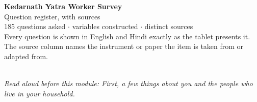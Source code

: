 \documentclass[9pt,a4paper,landscape]{article}
\begin{document}
\begin{center}
{\LARGE\bfseries Kedarnath Yatra Worker Survey}\\[3pt]
{\large Question register, with sources}\\[8pt]
185 questions asked \quad$\cdot$ variables constructed \quad$\cdot$ distinct sources\\[3pt]
{\small Every question is shown in English and Hindi exactly as the tablet presents it. The source
column names the instrument or paper the item is taken from or adapted from.}
\end{center}
\vspace{4pt}
\\[3pt]
{\small\itshape Read aloud before this module: First, a few things about you and the people who live in your household.}\\[5pt]
\end{document}
